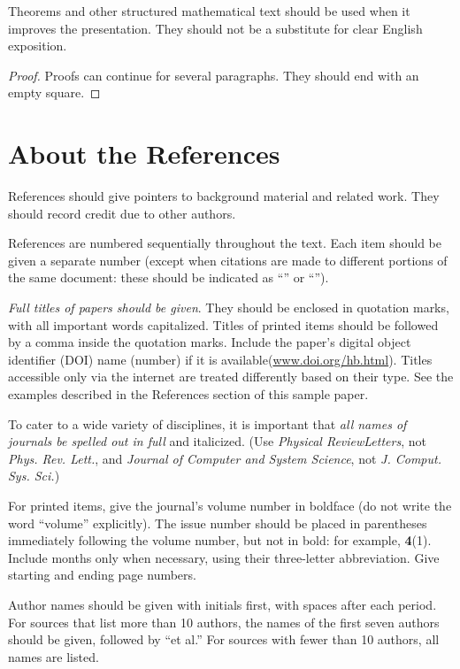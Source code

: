 \documentclass{article}
\begin{document}
\begin{theorem}
Theorems and other structured mathematical text should be used when it improves the presentation. They should not be a substitute for clear English exposition. 
\end{theorem}

\begin{proof}
Proofs can continue for several paragraphs. They should end with an empty square.
\end{proof}


\section{About the References}

References should give pointers to background material and related work. They should record credit due to other authors. 

References are numbered sequentially throughout the text. 
Each item should be given a separate number (except when citations are made to different portions of the same document: these should be indicated as {``}\cite[pp. 3--56]{text-a}{''} or {``}\cite[Chapter 14]{text-b}{''}). 

\textit{Full titles of papers should be given}. They should be enclosed in quotation marks, with all important words capitalized. Titles of printed items should be followed by a comma inside the quotation marks. Include the paper{'}s digital object identifier (DOI) name (number) if it is available(\url{www.doi.org/hb.html}). Titles accessible only via the internet are treated differently based on their type. See the examples described in the References section of this sample paper.

To cater to a wide variety of disciplines, it is important that \textit{all names of journals be spelled out in full} and italicized. (Use \textit{Physical ReviewLetters}, not\textit{ Phys. Rev. Lett.}, and \textit{Journal of Computer and System Science}, not \textit{J. Comput. Sys. Sci.}) 

For printed items, give the journal{'}s volume number in boldface (do not write the word {``}volume{''} explicitly). The issue number should be placed in parentheses immediately following the volume number, but not in bold: for example, \textbf{4}(1). Include months only when necessary, using their three-letter abbreviation. Give starting and ending page numbers.

Author names should be given with initials first, with spaces after each period. For sources that list more than 10 authors, the names of the first seven authors should be given, followed by {``}et al.{''} For sources with fewer than 10 authors, all names are listed.
\end{document}
